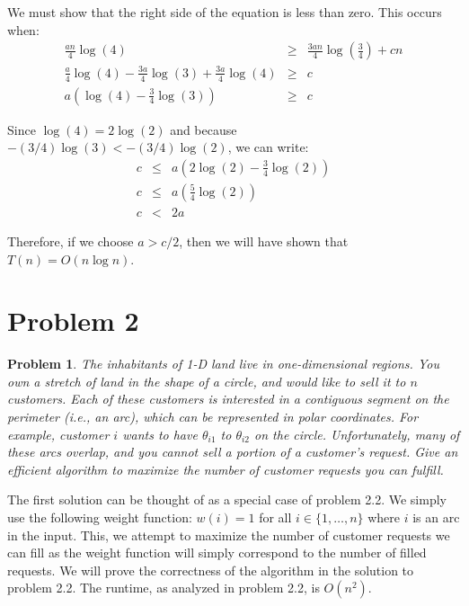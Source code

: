 \documentclass[psamsfonts]{amsart}
\newtheorem{prob}{Problem}[section]
\newenvironment{sol}{{\bfseries Solution}}{\qedsymbol}
\theoremstyle{definition}
\theoremstyle{remark}
\numberwithin{equation}{section}
\begin{document}
\begin{sol}
We must show that the right side of the equation is less than zero. This occurs when:
\begin{eqnarray}
\frac{an}{4} \log (4) &\geq& \frac{3an}{4} \log \left( \frac{3}{4} \right) + cn \\
\frac{a}{4} \log (4) - \frac{3a}{4} \log(3) + \frac{3a}{4} \log(4) &\geq& c \\
a \left( \log(4) - \frac{3}{4} \log(3) \right) &\geq& c
\end{eqnarray}

Since $\log(4) = 2 \log(2)$ and because $-(3/4) \log(3) < -(3/4) \log(2)$, we can write:
\begin{eqnarray}
c &\leq& a \left( 2 \log(2) - \frac{3}{4} \log(2) \right) \\
c &\leq& a \left( \frac{5}{4} \log(2) \right) \\
c &<& 2a
\end{eqnarray}

Therefore, if we choose $a > c/2$, then we will have shown that $T(n) = O(n \log n)$. 
\end{sol}

\section{Problem 2}

\begin{prob}
The inhabitants of 1-D land live in one-dimensional regions. You own a stretch of land in the shape of a circle, and would like to sell it to $n$ customers. Each of these customers is interested in a contiguous segment on the perimeter (i.e., an arc), which can be represented in polar coordinates. For example, customer $i$ wants to have $\theta_{i1}$ to $\theta_{i2}$ on the circle. Unfortunately, many of these arcs overlap, and you cannot sell a portion of a customer's request. Give an efficient algorithm to maximize the number of customer requests you can fulfill.
\end{prob}

\begin{sol}
The first solution can be thought of as a special case of problem 2.2. We simply use the following weight function: $w(i) = 1$ for all $i \in \{1, \ldots, n \}$ where $i$ is an arc in the input. This, we attempt to maximize the number of customer requests we can fill as the weight function will simply correspond to the number of filled requests. We will prove the correctness of the algorithm in the solution to problem 2.2. The runtime, as analyzed in problem 2.2, is $O(n^2)$. 
\end{sol}
\end{document}
